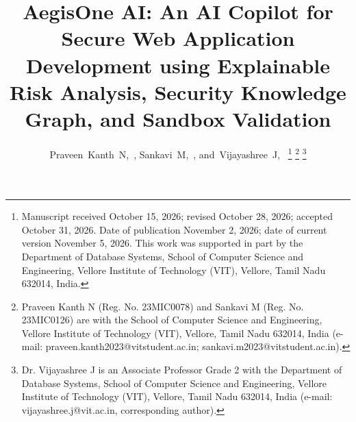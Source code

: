 \documentclass[journal,twoside]{IEEEtran}
\begin{document}
\title{AegisOne AI: An AI Copilot for Secure Web Application Development using Explainable Risk Analysis, Security Knowledge Graph, and Sandbox Validation}

\author{Praveen~Kanth~N,~,
        Sankavi~M,~,
        and~Vijayashree~J,~%
\thanks{Manuscript received October 15, 2026; revised October 28, 2026; accepted October 31, 2026. Date of publication November 2, 2026; date of current version November 5, 2026. This work was supported in part by the Department of Database Systems, School of Computer Science and Engineering, Vellore Institute of Technology (VIT), Vellore, Tamil Nadu 632014, India.}%
\thanks{Praveen Kanth N (Reg. No. 23MIC0078) and Sankavi M (Reg. No. 23MIC0126) are with the School of Computer Science and Engineering, Vellore Institute of Technology (VIT), Vellore, Tamil Nadu 632014, India (e-mail: praveen.kanth2023@vitstudent.ac.in; sankavi.m2023@vitstudent.ac.in).}%
\thanks{Dr. Vijayashree J is an Associate Professor Grade 2 with the Department of Database Systems, School of Computer Science and Engineering, Vellore Institute of Technology (VIT), Vellore, Tamil Nadu 632014, India (e-mail: vijayashree.j@vit.ac.in, corresponding author).}%
}

\maketitle
\thispagestyle{empty}
\pagestyle{empty}
\end{document}
